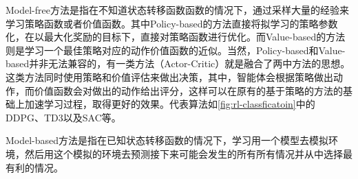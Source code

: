 Model-free方法是指在不知道状态转移函数函数的情况下，通过采样大量的经验来学习策略函数或者价值函数。其中Policy-based的方法直接将拟学习的策略参数化，在以最大化奖励的目标下，直接对策略函数进行优化。而Value-based的方法则是学习一个最佳策略对应的动作价值函数的近似。当然，Policy-based和Value-based并非无法兼容的，有一类方法（Actor-Critic）就是融合了两中方法的思想。
这类方法同时使用策略和价值评估来做出决策，其中，智能体会根据策略做出动作，而价值函数会对做出的动作给出评分，这样可以在原有的基于策略的方法的基础上加速学习过程，取得更好的效果。代表算法如\autoref{fig:rl-classficatoin}中的DDPG\cite{lillicrap2015continuous}、TD3\cite{fujimoto2018addressing}以及SAC\cite{haarnoja2018soft}等。

Model-based方法是指在已知状态转移函数的情况下，学习用一个模型去模拟环境，然后用这个模拟的环境去预测接下来可能会发生的所有所有情况并从中选择最有利的情况。



